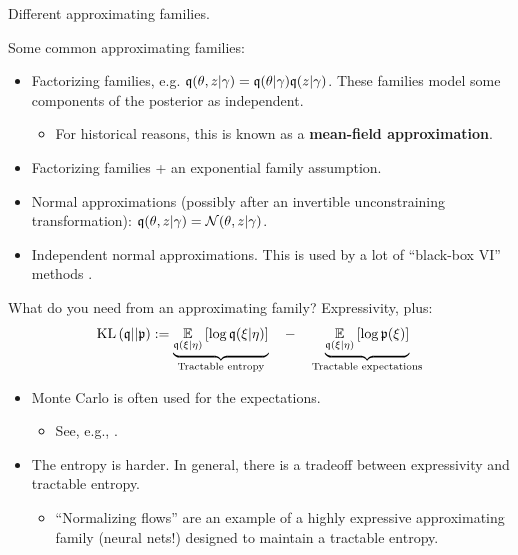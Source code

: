 \begin{frame}{Different approximating families.}

Some common approximating families:
%
\begin{itemize}
%
\item Factorizing families, e.g.
$\mathfrak{q}(\theta, z \vert \gamma) = \mathfrak{q}(\theta \vert
\gamma) \mathfrak{q}(z \vert \gamma)$.  These families model some components
of the posterior as independent.
\begin{itemize}
\item For historical reasons, this is known as a
\textbf{mean-field approximation}.
\end{itemize}
%
\item Factorizing families + an exponential family assumption.
%
\item Normal approximations (possibly after an invertible
unconstraining transformation): $\mathfrak{q}(\theta, z \vert \gamma) =
\mathcal{N}(\theta, z | \gamma)$.
%
\item Independent normal approximations.  This is used by a lot of
``black-box VI'' methods \citep{ranganath2014black, kucukelbir2017automatic}.
%
\end{itemize}
%
\pause

\hrulefill

What do you need from an approximating family?  Expressivity, plus:
%
\begin{align*}
%
\kl{\q}{\p} :=
\underbrace{
    \expect{\q(\xi | \eta)}{\log \q(\xi | \eta)}
}_{\textrm{Tractable entropy}}
\quad     - \quad
\underbrace{
    \expect{\q(\xi | \eta)}{\log \p(\xi)}
}_{\textrm{Tractable expectations}}
%
\end{align*}
%

\pause

\begin{itemize}
\item Monte Carlo is often used for the expectations.
\begin{itemize}
    \item See, e.g., \citet{ranganath2014black}.
\end{itemize}

\item The entropy is harder.  In general, there is a tradeoff between expressivity
and tractable entropy.
\begin{itemize}
\item ``Normalizing flows'' are an example of a highly expressive approximating
family (neural nets!) designed to maintain a tractable entropy.
\citep{rezende2015variational}
\end{itemize}
\end{itemize}



\end{frame}
